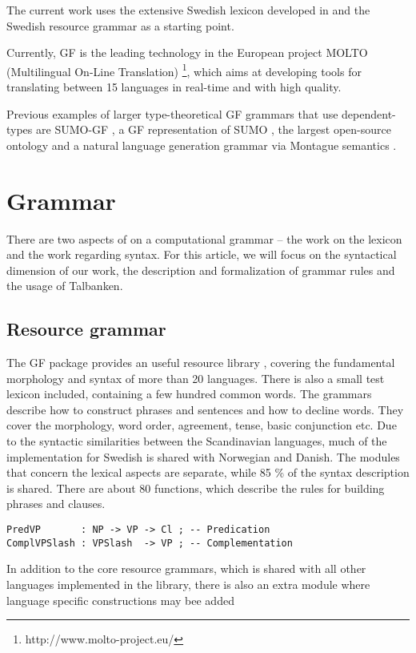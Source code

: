 \documentclass[runningheads,a4paper]{llncs}
\begin{document}
The current work uses the extensive Swedish
lexicon developed in \cite{ahlbergEnache} and the Swedish resource
grammar as a starting point. 

Currently, GF is the leading technology in the European project
MOLTO (Multilingual On-Line Translation)
\footnote{http://www.molto-project.eu/}, which aims at developing
 tools for translating between 15 languages in real-time and with high quality. 

Previous examples of larger type-theoretical GF grammars that use 
dependent-types are SUMO-GF \cite{ontologies2}, a GF representation of
SUMO \cite{sumo}, the largest open-source ontology and  a natural
language generation grammar via Montague semantics \cite{montague}.



\section{Grammar}

There are two aspects of on a computational grammar -- the work on the lexicon
and the work regarding syntax.  For this article, we will focus on the
syntactical dimension of our work, the description and formalization of grammar
rules and the usage of Talbanken.

\subsection{Resource grammar}

The GF package provides an useful resource library \cite{gf-resource}, covering the
fundamental morphology and syntax of more than 20 languages.
There is also a small test lexicon included, containing a few hundred common
words.
The grammars describe how to construct phrases and sentences and how to
decline words. They cover the morphology,
word order, agreement, tense, basic conjunction etc.
Due to the syntactic similarities between the Scandinavian languages, much of
the implementation for Swedish is shared with Norwegian and Danish. The modules
that concern the lexical aspects are separate, while 85 \% of the syntax
description is shared.  There are about 80 functions, which describe the rules
for building phrases and clauses.
\begin{verbatim}
PredVP       : NP -> VP -> Cl ; -- Predication
ComplVPSlash : VPSlash  -> VP ; -- Complementation
\end{verbatim}
In addition to the core resource grammars, which is shared with all other
languages implemented in the library, there is also an extra module
where language specific constructions may bee added
\end{document}
